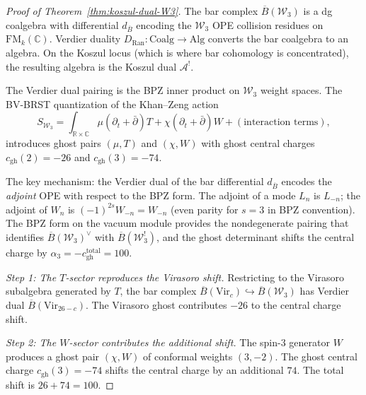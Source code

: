 \documentclass[11pt]{article}
\newcommand{\cA}{\mathcal{A}}
\newcommand{\cW}{\mathcal{W}}
\newcommand{\barB}{\overline{B}}
\newcommand{\C}{\mathbb{C}}
\newcommand{\R}{\mathbb{R}}
\begin{document}
\begin{proof}[Proof of Theorem~\ref{thm:koszul-dual-W3}]
The bar complex $\barB(\cW_3)$ is a dg coalgebra with differential
$d_{\barB}$ encoding the $\cW_3$ OPE collision residues on
$\mathrm{FM}_k(\C)$.  Verdier duality
$D_{\mathrm{Ran}}\colon \mathrm{Coalg} \to \mathrm{Alg}$
converts the bar coalgebra to an algebra.  On the Koszul locus
(which is where bar cohomology is concentrated), the resulting
algebra is the Koszul dual $\cA^!$.

The Verdier dual pairing is the BPZ inner product on $\cW_3$
weight spaces.  The BV-BRST quantization of the Khan--Zeng action
\[
S_{\cW_3} = \int_{\R \times \C}
\mu(\partial_t + \bar\partial)T + \chi(\partial_t + \bar\partial)W
+ (\text{interaction terms}),
\]
introduces ghost pairs $(\mu, T)$ and $(\chi, W)$ with ghost
central charges $c_{\mathrm{gh}}(2) = -26$ and
$c_{\mathrm{gh}}(3) = -74$.

The key mechanism: the Verdier dual of the bar differential
$d_{\barB}$ encodes the \emph{adjoint} OPE with respect to the
BPZ form.  The adjoint of a mode $L_n$ is $L_{-n}$; the adjoint of
$W_n$ is $(-1)^{2s}W_{-n} = W_{-n}$ (even parity for $s = 3$ in
BPZ convention).  The BPZ form on the vacuum module provides the
nondegenerate pairing that identifies $\barB(\cW_3)^{\vee}$ with
$\barB(\cW_3^!)$, and the ghost determinant shifts the central
charge by $\alpha_3 = -c_{\mathrm{gh}}^{\mathrm{total}} = 100$.

\medskip
\noindent\emph{Step 1: The $T$-sector reproduces the Virasoro shift.}
Restricting to the Virasoro subalgebra generated by $T$, the
bar complex $\barB(\mathrm{Vir}_c) \hookrightarrow \barB(\cW_3)$
has Verdier dual $\barB(\mathrm{Vir}_{26-c})$.  The Virasoro
ghost contributes $-26$ to the central charge shift.

\medskip
\noindent\emph{Step 2: The $W$-sector contributes the additional shift.}
The spin-$3$ generator $W$ produces a ghost pair $(\chi, W)$ of
conformal weights $(3, -2)$.  The ghost central charge
$c_{\mathrm{gh}}(3) = -74$ shifts the central charge by an
additional $74$.  The total shift is $26 + 74 = 100$.


\end{proof}
\end{document}
